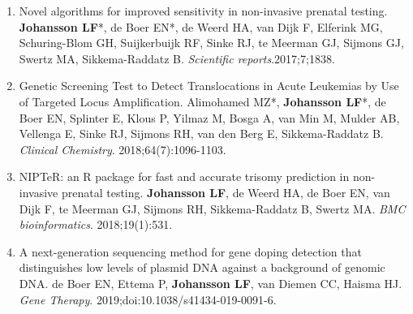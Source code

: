 \begin{appendices}
\begin{enumerate}
	\item Novel algorithms for improved sensitivity in non-invasive prenatal testing. \textbf{Johansson LF}*, de Boer EN*, de Weerd HA, van Dijk F, Elferink MG, Schuring-Blom GH, Suijkerbuijk RF, Sinke RJ, te Meerman GJ, Sijmons GJ, Swertz MA, Sikkema-Raddatz B. \textsl{Scientific reports}.2017;7;1838.
	\item Genetic Screening Test to Detect Translocations in Acute Leukemias by Use of Targeted Locus Amplification. Alimohamed MZ*, \textbf{Johansson LF}*, de Boer EN, Splinter E, Klous P, Yilmaz M, Bosga A, van Min M, Mulder AB, Vellenga E, Sinke RJ, Sijmons RH, van den Berg E, Sikkema-Raddatz B. \textsl{Clinical Chemistry}. 2018;64(7):1096-1103.
	\item NIPTeR: an R package for fast and accurate trisomy prediction in non-invasive prenatal testing. \textbf{Johansson LF}, de Weerd HA, de Boer EN, van Dijk F, te Meerman GJ, Sijmons RH, Sikkema-Raddatz B, Swertz MA. \textsl{BMC bioinformatics}. 2018;19(1):531.
	\item A next-generation sequencing method for gene doping detection that distinguishes low levels of plasmid DNA against a background of genomic DNA. de Boer EN, Ettema P, \textbf{Johansson LF}, van Diemen CC, Haisma HJ. \textsl{Gene Therapy}. 2019;doi:10.1038/s41434-019-0091-6.
	\end{enumerate}
	


\end{appendices}
